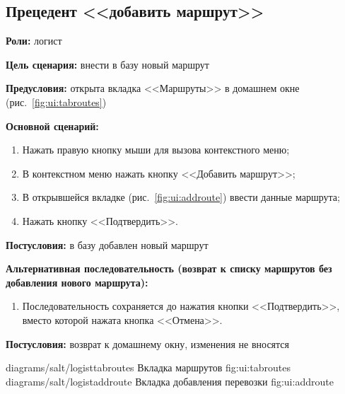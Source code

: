 \subsection{Прецедент <<добавить маршрут>>}
\textbf{Роли:} логист \par
\textbf{Цель сценария:} внести в базу новый маршрут \par
\textbf{Предусловия:} открыта вкладка <<Маршруты>> 
    в домашнем окне (рис.~\ref{fig:ui:tabroutes}) \par
\textbf{Основной сценарий:} 
\begin{enumerate}
    \item Нажать правую кнопку мыши для вызова контекстного меню;
    \item В контекстном меню нажать кнопку <<Добавить маршрут>>;
    \item В открывшейся вкладке (рис.~\ref{fig:ui:addroute}) 
        ввести данные маршрута;
    \item Нажать кнопку <<Подтвердить>>.
\end{enumerate} \par
\textbf{Постусловия:} в базу добавлен новый маршрут \par
\textbf{Альтернативная последовательность 
    (возврат к списку маршрутов без добавления нового маршрута):} \par
\begin{enumerate}
    \item Последовательность сохраняется до нажатия кнопки <<Подтвердить>>, 
        вместо которой нажата кнопка <<Отмена>>.
\end{enumerate} \par
\textbf{Постусловия:} возврат к домашнему окну, изменения не вносятся \par
\image
    {diagrams/salt/logisttabroutes}
    {Вкладка маршрутов}
    {fig:ui:tabroutes}
\image
    {diagrams/salt/logistaddroute}
    {Вкладка добавления перевозки}
    {fig:ui:addroute}

